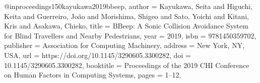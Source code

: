 @inproceedings{150kayukawa2019bbeep,
author = {Kayukawa, Seita and Higuchi, Keita and Guerreiro, Jo\~{a}o and Morishima, Shigeo and Sato, Yoichi and Kitani, Kris and Asakawa, Chieko},
title = {BBeep: A Sonic Collision Avoidance System for Blind Travellers and Nearby Pedestrians},
year = {2019},
isbn = {9781450359702},
publisher = {Association for Computing Machinery},
address = {New York, NY, USA},
url = {https://doi.org/10.1145/3290605.3300282},
doi = {10.1145/3290605.3300282},
booktitle = {Proceedings of the 2019 CHI Conference on Human Factors in Computing Systems},
pages = {1–12},
}